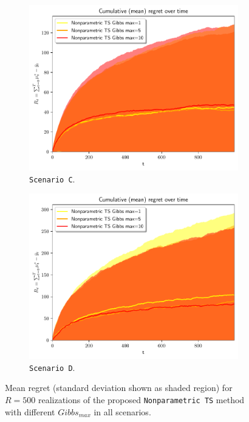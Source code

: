 \begin{figure}[!h]
	\begin{subfigure}[c]{0.45\textwidth}
		\includegraphics[width=\textwidth]{./figs/linear_gaussian_mixture_unbalanced_gibbsmaxiter/cum_optexpected_regret_top_five_std}
		\vspace*{-5ex}
		\caption{\texttt{Scenario C}.}
		\label{fig:scenario_C_gibbsmaxiter_std}
	\end{subfigure}
	\begin{subfigure}[c]{0.45\textwidth}
		\includegraphics[width=\textwidth]{./figs/linear_gaussian_mixture_heavy_tail_gibbsmaxiter/cum_optexpected_regret_top_five_std}
		\vspace*{-5ex}
		\caption{\texttt{Scenario D}.}
		\label{fig:scenario_D_gibbsmaxiter_std}
	\end{subfigure}
	\vspace*{-2ex}
	\caption{Mean regret (standard deviation shown as shaded region) for $R=500$ realizations of the proposed \texttt{Nonparametric TS} method with different $Gibbs_{max}$ in all scenarios.}
	\label{fig:mixture_scenarios_bandit_showdown_gibbsmaxiter}
\end{figure}

